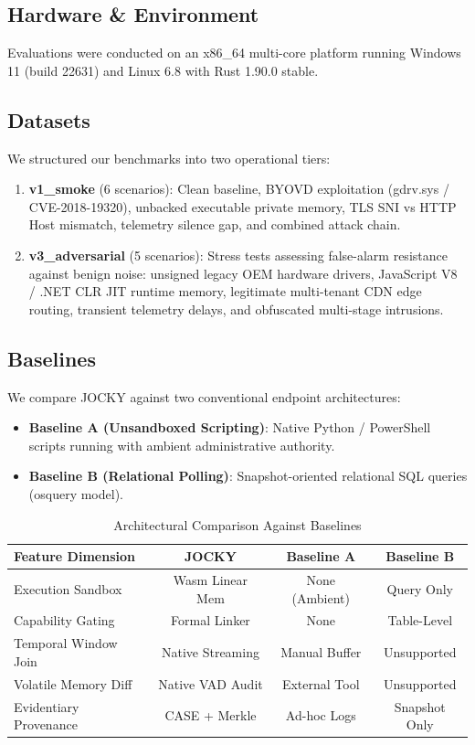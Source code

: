 \documentclass[10pt,conference]{IEEEtran}
\begin{document}
\subsection{Hardware \& Environment}
Evaluations were conducted on an x86\_64 multi-core platform running Windows 11 (build 22631) and Linux 6.8 with Rust 1.90.0 stable.

\subsection{Datasets}
We structured our benchmarks into two operational tiers:
\begin{enumerate}
    \item \textbf{v1\_smoke} (6 scenarios): Clean baseline, BYOVD exploitation (gdrv.sys / CVE-2018-19320), unbacked executable private memory, TLS SNI vs HTTP Host mismatch, telemetry silence gap, and combined attack chain.
    \item \textbf{v3\_adversarial} (5 scenarios): Stress tests assessing false-alarm resistance against benign noise: unsigned legacy OEM hardware drivers, JavaScript V8 / .NET CLR JIT runtime memory, legitimate multi-tenant CDN edge routing, transient telemetry delays, and obfuscated multi-stage intrusions.
\end{enumerate}

\subsection{Baselines}
We compare JOCKY against two conventional endpoint architectures:
\begin{itemize}
    \item \textbf{Baseline A (Unsandboxed Scripting)}: Native Python / PowerShell scripts running with ambient administrative authority.
    \item \textbf{Baseline B (Relational Polling)}: Snapshot-oriented relational SQL queries (osquery model).
\end{itemize}

\begin{table}[h]
\centering
\caption{Architectural Comparison Against Baselines}
\label{tab:baseline_comp}
\begin{tabular}{@{}lccc@{}}
\toprule
\textbf{Feature Dimension} & \textbf{JOCKY} & \textbf{Baseline A} & \textbf{Baseline B} \\ \midrule
Execution Sandbox & Wasm Linear Mem & None (Ambient) & Query Only \\
Capability Gating & Formal Linker & None & Table-Level \\
Temporal Window Join & Native Streaming & Manual Buffer & Unsupported \\
Volatile Memory Diff & Native VAD Audit & External Tool & Unsupported \\
Evidentiary Provenance & CASE + Merkle & Ad-hoc Logs & Snapshot Only \\ \bottomrule
\end{tabular}
\end{table}
\end{document}
